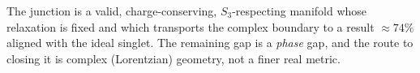 \documentclass[11pt]{article}
\theoremstyle{definition}
\begin{document}
\noindent
The junction is a valid, charge-conserving, $S_3$-respecting manifold whose
relaxation is fixed and which transports the complex boundary to a result
$\approx 74\%$ aligned with the ideal singlet. The remaining gap is a
\emph{phase} gap, and the route to closing it is complex (Lorentzian) geometry,
not a finer real metric.
\end{document}

